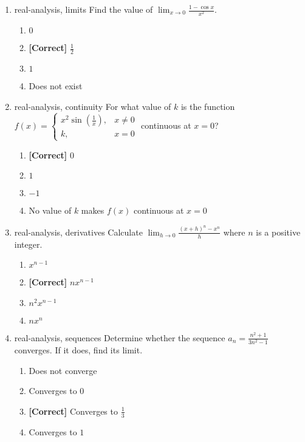 \documentclass{article}
\newenvironment{problem}{\item}{}
\newcommand{\choice}{\item}
\newcommand{\correctchoice}{\item \textbf{[Correct] }}
\newcommand{\tags}[1]{#1} %
\begin{document}
\begin{enumerate}
        \begin{problem}
            \tags{real-analysis, limits}
            Find the value of $\lim_{x \to 0} \frac{1-\cos x}{x^2}$.
            \begin{enumerate}
                \choice $0$
                \correctchoice $\frac{1}{2}$
                \choice $1$
                \choice Does not exist
            \end{enumerate}
        \end{problem}
        
        \begin{problem}
            \tags{real-analysis, continuity}
            For what value of $k$ is the function $f(x) = \begin{cases}
                x^2\sin\left(\frac{1}{x}\right), & x \neq 0 \\
                k, & x = 0
            \end{cases}$ continuous at $x = 0$?
            \begin{enumerate}
                \correctchoice $0$
                \choice $1$
                \choice $-1$
                \choice No value of $k$ makes $f(x)$ continuous at $x = 0$
            \end{enumerate}
        \end{problem}
        
        \begin{problem}
            \tags{real-analysis, derivatives}
            Calculate $\lim_{h \to 0} \frac{(x+h)^n - x^n}{h}$ where $n$ is a positive integer.
            \begin{enumerate}
                \choice $x^{n-1}$
                \correctchoice $nx^{n-1}$
                \choice $n^2x^{n-1}$
                \choice $nx^n$
            \end{enumerate}
        \end{problem}
        
        \begin{problem}
            \tags{real-analysis, sequences}
            Determine whether the sequence $a_n = \frac{n^2+1}{3n^2-1}$ converges. If it does, find its limit.
            \begin{enumerate}
                \choice Does not converge
                \choice Converges to $0$
                \correctchoice Converges to $\frac{1}{3}$
                \choice Converges to $1$
            \end{enumerate}
        \end{problem}
        

\end{enumerate}
\end{document}
